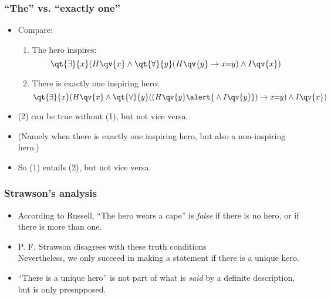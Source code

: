 \begin{frame}
\frametitle{``The'' vs. ``exactly one''}

\begin{itemize}[<+->]
\item Compare:
\begin{enumerate}[<+->]
\item The hero inspires:
\[\qt{\exists}{x}(H\qv{x} \land \qt{\forall}{y}(H\qv{y} \to x\!\!=\!\!y) \land I\qv{x})\]
\item There is exactly one inspiring hero:
\[\qt{\exists}{x}(H\qv{x} \land \qt{\forall}{y}((H\qv{y} \alert{{}\land I\qv{y}}) \to x\!\!=\!\!y) \land I\qv{x})\]
\end{enumerate}
\item (2) can be true without (1), but not vice versa.
\item (Namely when there is exactly one inspiring hero, but also a non-inspiring hero.)
\item So (1) entails (2), but not vice versa.
\end{itemize}
\end{frame}

\begin{frame}
    \frametitle{Strawson's analysis}

\begin{itemize}
\item According to Russell, ``The hero wears a cape'' is \emph{false} if there is no hero, or if there is more than one.
\item P. F. Strawson disagrees with these truth conditions \\ Nevertheless, we only succeed in making a statement \textcolor{OGlyallpink}{if there is a unique hero}.
\item ``There is a unique hero'' is not part of what is \emph{said} by a definite description, but is only \textcolor{OGlyallpink}{presupposed}.
\end{itemize}
\end{frame}

